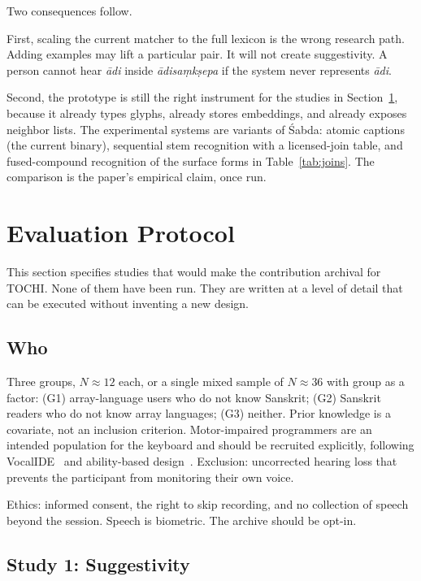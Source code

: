 \documentclass[manuscript, review, anonymous]{acmart}
\begin{document}
Two consequences follow.

First, scaling the current matcher to the full lexicon is the wrong research path. Adding examples may lift a particular pair. It will not create suggestivity. A person cannot hear \textit{{\=a}di} inside \textit{{\=a}disa{\d{m}}k{\d{s}}epa} if the system never represents \textit{{\=a}di}.

Second, the prototype is still the right instrument for the studies in Section~\ref{sec:eval}, because it already types glyphs, already stores embeddings, and already exposes neighbor lists. The experimental systems are variants of {\'S}abda: atomic captions (the current binary), sequential stem recognition with a licensed-join table, and fused-compound recognition of the surface forms in Table~\ref{tab:joins}. The comparison is the paper's empirical claim, once run.

\section{Evaluation Protocol}
\label{sec:eval}

This section specifies studies that would make the contribution archival for TOCHI. None of them have been run. They are written at a level of detail that can be executed without inventing a new design.

\subsection{Who}

Three groups, $N \approx 12$ each, or a single mixed sample of $N \approx 36$ with group as a factor: (G1) array-language users who do not know Sanskrit; (G2) Sanskrit readers who do not know array languages; (G3) neither. Prior knowledge is a covariate, not an inclusion criterion. Motor-impaired programmers are an intended population for the keyboard and should be recruited explicitly, following VocalIDE~\cite{RosenblattVocalIDE} and ability-based design~\cite{Wobbrock2011Ability}. Exclusion: uncorrected hearing loss that prevents the participant from monitoring their own voice.

Ethics: informed consent, the right to skip recording, and no collection of speech beyond the session. Speech is biometric. The archive should be opt-in.

\subsection{Study 1: Suggestivity}
\end{document}

